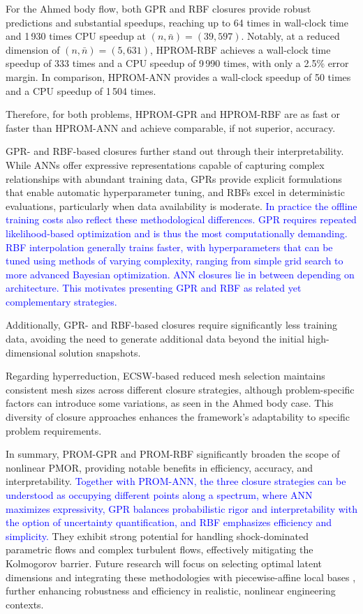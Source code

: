 \documentclass[preprint,10pt]{elsarticle}
\begin{document}
For the Ahmed body flow, both GPR and RBF closures provide robust predictions and substantial speedups, reaching up to 64 times in 
wall-clock time and 1\,930 times CPU speedup at $(n, \bar{n}) = (39, 597)$. Notably, at a reduced dimension of $(n, \bar{n}) = 
(5, 631)$, HPROM-RBF achieves a wall-clock time speedup of 333 times and a CPU speedup of 9\,990 times, with only a 2.5\% error margin.
In comparison, HPROM-ANN provides a wall-clock speedup of 50 times and a CPU speedup of 1\,504 times.

Therefore, for both problems, HPROM-GPR and HPROM-RBF are as fast or faster than HPROM-ANN and achieve comparable, if not superior,
accuracy.

GPR- and RBF-based closures further stand out through their interpretability. While ANNs offer expressive representations capable of capturing complex relationships with abundant training data, GPRs provide explicit formulations that enable automatic hyperparameter tuning, and RBFs excel in deterministic evaluations, particularly when data availability is moderate. \textcolor{blue}{In practice the offline training costs also reflect these methodological differences. GPR requires repeated likelihood-based optimization and is thus the most computationally demanding. RBF interpolation generally trains faster, with hyperparameters that can be tuned using methods of varying complexity, ranging from simple grid search to more advanced Bayesian optimization. ANN closures lie in between depending on architecture. This motivates presenting GPR and RBF as related yet complementary strategies.}

Additionally, GPR- and RBF-based closures require significantly less training data, avoiding the need to generate additional data 
beyond the initial high-dimensional solution snapshots. 

Regarding hyperreduction, ECSW-based reduced mesh selection maintains consistent mesh sizes across different closure strategies, 
although problem-specific factors can introduce some variations, as seen in the Ahmed body case. This diversity of closure approaches 
enhances the framework's adaptability to specific problem requirements.

In summary, PROM-GPR and PROM-RBF significantly broaden the scope of nonlinear PMOR, providing notable benefits in efficiency, accuracy, and interpretability. \textcolor{blue}{Together with PROM-ANN, the three closure strategies can be understood as occupying different points along a spectrum, where ANN maximizes expressivity, GPR balances probabilistic rigor and interpretability with the option of uncertainty quantification, and RBF emphasizes efficiency and simplicity.} They exhibit strong potential for handling shock-dominated parametric flows and complex turbulent flows, effectively mitigating the Kolmogorov barrier. Future research will focus on selecting optimal latent dimensions and integrating these methodologies with piecewise-affine local bases \cite{amsallem2012nonlinear, grimberg2021mesh}, further enhancing robustness and efficiency in realistic, nonlinear engineering contexts.
\end{document}
